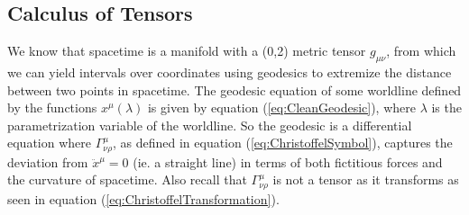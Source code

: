 \documentclass{article}
\begin{document}
 		\subsection{Calculus of Tensors}
 			We know that spacetime is a manifold with a (0,2) metric tensor $g_{\mu\nu}$, from which we can yield intervals over coordinates using geodesics to extremize the distance between two points in spacetime. The geodesic equation of some worldline defined by the functions $x^\mu (\lambda)$ is given by equation (\ref{eq:CleanGeodesic}), where $\lambda$ is the parametrization variable of the worldline. So the geodesic is a differential equation where $\Gamma_{\nu\rho}^\mu$, as defined in equation (\ref{eq:ChristoffelSymbol}), captures the deviation from $\ddot{x}^\mu = 0$ (ie. a straight line) in terms of both fictitious forces and the curvature of spacetime. Also recall that $\Gamma_{\nu\rho}^\mu$ is not a tensor as it transforms as seen in equation (\ref{eq:ChristoffelTransformation}).
 			
\end{document}
